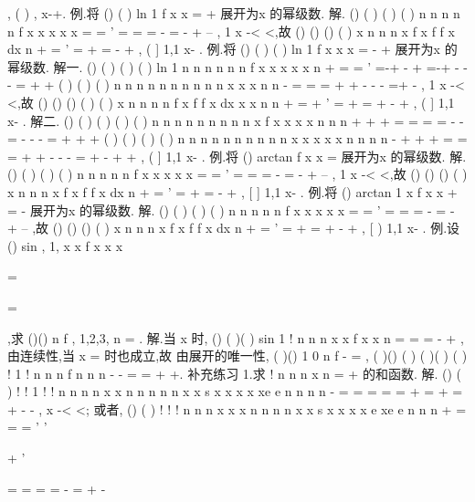 \sum 
\sum 
,
(
)
,
x\in -\infty +\infty . 
\textcolor{lyred}{例}.将
()
(
)
ln 1
f x
x
=
+
展开为x 的幂级数. 
解.
()
(
)
(
)
(
)
n
n
n
n
n
f
x
x
x
x
x
\infty 
\infty 
=
=
'
=
=
=
-
=
-
+
--
\sum 
\sum 
, 1
x
-<
<,故 
()
()
()
(
)
x
n
n
n
x
f x
f
f
x dx
n
+
\infty 
=
'
=
+
=
-
+
\sum 
\int 
,
(
]
1,1
x\in -
. 
\textcolor{lyred}{例}.将
()
(
)
(
)
ln 1
f x
x
x
=
-
+
展开为x 的幂级数. 
解一.
()
(
)
(
)
(
)
ln 1
n
n
n
n
n
n
f
x
x
x
x
x
n
\infty 
\infty 
+
=
=
'
=-+
-
+
=-+
-
-
-
=
+
+
\sum 
\sum 
(
)
(
)
(
)
n
n
n
n
n
n
n
n
n
n
x
x
x
n
n
\infty 
\infty 
\infty 
-
=
=
=
+
+
-
-
-
=+
-
\sum 
\sum 
\sum 
, 1
x
-<
<,故 
()
()
()
(
)
(
)
x
n
n
n
n
f x
f
f
x dx
x
x
n n
\infty 
+
=
+
'
=
+
=
+
-
+
\sum 
\int 
,
(
]
1,1
x\in -
. 
解二.
()
(
)
(
)
(
)
(
)
n
n
n
n
n
n
n
n
n
x
f x
x
x
x
n
n
n
+
\infty 
\infty 
\infty 
+
+
=
=
=
=
-
-
=
-
-
-
=
+
+
+
\sum 
\sum 
\sum 
(
)
(
)
(
)
(
)
n
n
n
n
n
n
n
n
n
n
x
x
x
x
x
n
n
n n
\infty 
\infty 
\infty 
-
+
+
+
=
=
=
+
+
-
-
-
=
+
-
+
+
\sum 
\sum 
\sum 
,
(
]
1,1
x\in -
. 
\textcolor{lyred}{例}.将
()
arctan
f x
x
=
展开为x 的幂级数. 
解.
()
(
)
(
)
(
)
n
n
n
n
n
f
x
x
x
x
x
\infty 
\infty 
=
=
'
=
=
=
-
=
-
+
--
\sum 
\sum 
, 1
x
-<
<,故 
()
()
()
(
)
x
n
n
n
x
f x
f
f
x dx
n
+
\infty 
=
'
=
+
=
-
+
\sum 
\int 
,
[
]
1,1
x\in -
. 
\textcolor{lyred}{例}.将
()
arctan 1
x
f x
x
+
=
-
展开为x 的幂级数. 
解.
()
(
)
(
)
(
)
n
n
n
n
n
f
x
x
x
x
x
\infty 
\infty 
=
=
'
=
=
=
-
=
-
+
--
\sum 
\sum 
,故 
()
()
()
(
)
x
n
n
n
x
f x
f
f
x dx
n
\pi 
+
\infty 
=
'
=
+
=
+
-
+
\sum 
\int 
,
[
)
1,1
x\in -
. 
\textcolor{lyred}{例}.设
()
sin
,
1,
x
x
f x
x
x

\neq 

=

=

,求
()()
n
f
,
1,2,3,
n =
\Lambda . 
解.当
x \neq 
时,
()
(
)(
)
sin
1 !
n
n
n
x
x
f x
x
n
\infty 
=
=
=
-
+
\sum 
,由连续性,当
x =
时也成立,故 
由展开的唯一性,
(
)()
1 0
n
f
-
=
,
(
)()
(
)
(
)(
)
(
)
!
1 !
n
n
n
f
n
n
n
-
-
=
\cdots 
=
+
+. 
\textcolor{lyred}{补充练习 }
1.求
!
n
n
n
x
n
\infty 
=
+
\sum 
的和函数. 
解. ()
(
)
!
!
1 !
!
n
n
n
n
x
x
n
n
n
n
n
x
x
s x
x
x
x
xe
e
n
n
n
n
-
\infty 
\infty 
\infty 
\infty 
=
=
=
=
=
+
=
+
=
+
-
-
\sum 
\sum 
\sum 
\sum 
,
x
-\infty <
<\infty ; 
或者, ()
(
)
!
!
!
n
n
n
x
x
x
n
n
n
n
x
x
s x
x
x
x e
xe
e
n
n
n
+
\infty 
\infty 
\infty 
=
=
=
'
'




+
'


=
=
=
=
-
=
+
-










